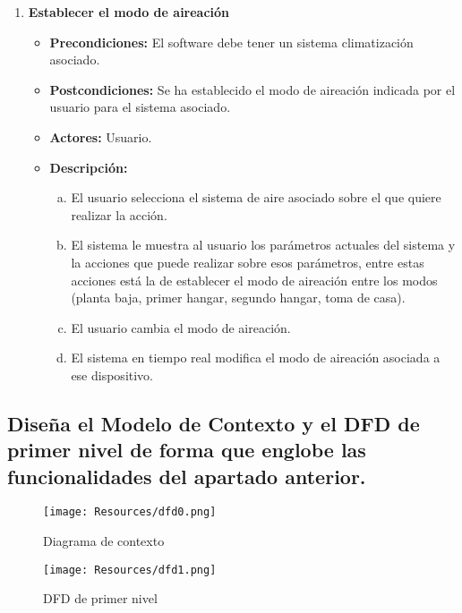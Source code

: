 \begin{enumerate}
    \item \textbf{Establecer el modo de aireación}
          \begin{itemize}
              \item \textbf{Precondiciones:} El software debe tener un sistema climatización asociado.
              \item \textbf{Postcondiciones:} Se ha establecido el modo de aireación indicada por el usuario para el sistema asociado.
              \item \textbf{Actores:} Usuario.
              \item \textbf{Descripción:}
                    \begin{enumerate}[a.]
                        \item El usuario selecciona el sistema de aire asociado sobre el que quiere realizar la acción.
                        \item El sistema le muestra al usuario los parámetros actuales del sistema y la acciones que puede realizar sobre esos parámetros, entre estas acciones está la de establecer el modo de aireación entre los modos (planta baja, primer hangar, segundo hangar, toma de casa).
                        \item El usuario cambia el modo de aireación.
                        \item El sistema en tiempo real modifica el modo de aireación asociada a ese dispositivo.
                    \end{enumerate}
          \end{itemize}


\end{enumerate}

\subsection{Diseña el Modelo de Contexto y el DFD de primer nivel de forma que englobe las funcionalidades del apartado anterior.}

\begin{figure}[H]
    \centering
    \texttt{[image: Resources/dfd0.png]}
    \caption{Diagrama de contexto}
    \label{fig:dfd0}
\end{figure}
\begin{figure}[H]
    \centering
    \texttt{[image: Resources/dfd1.png]}
    \caption{DFD de primer nivel}
    \label{fig:dfd1}
\end{figure}


